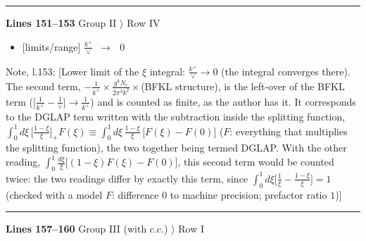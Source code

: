 \documentclass[10pt]{article}
\newenvironment{notebox}{\def\FrameCommand{{\color{notebar}\vrule width 1.5pt}\hspace{6pt}}\MakeFramed{\advance\hsize-\width\FrameRestore}\small}{\endMakeFramed}
\begin{document}
\noindent\rule{\linewidth}{0.3pt}\par\noindent\textbf{Lines 151--153} \quad \textsf{Group II $\rangle$ Row IV} \par
\begin{itemize}[leftmargin=2.2em,itemsep=1pt,topsep=2pt]
\item[\textbf{l.151}] \textsf{\small [limits/range]} $\displaystyle \frac{k^{+}}{\vee}$\ $\longrightarrow$\ $\displaystyle \,0$
\end{itemize}
\begin{notebox}\textsf{\small Note, l.153:} [Lower limit of the $\xi$ integral: $\frac{k^{+}}{\vee}\to0$ (the integral converges there). The second term, $-\frac{1}{k^{+}}\times\frac{g^{4}N_{c}}{2\pi^{3}k^{2}}\times$(BFKL structure), is the left-over of the BFKL term ($\big[\frac{1}{k^{+}}-\frac{1}{\vee}\big]\to\frac{1}{k^{+}}$) and is counted as finite, as the author has it. It corresponds to the DGLAP term written with the subtraction inside the splitting function, $\int_{0}^{1}d\xi\,\big[\frac{1-\xi}{\xi}\big]_{+}F(\xi)\equiv\int_{0}^{1}d\xi\,\frac{1-\xi}{\xi}\,\big[F(\xi)-F(0)\big]$ ($F$: everything that multiplies the splitting function), the two together being termed DGLAP. With the other reading, $\int_{0}^{1}\frac{d\xi}{\xi}\big[(1-\xi)F(\xi)-F(0)\big]$, this second term would be counted twice: the two readings differ by exactly this term, since $\int_{0}^{1}d\xi\big[\frac{1}{\xi}-\frac{1-\xi}{\xi}\big]=1$ (checked with a model $F$: difference $0$ to machine precision; prefactor ratio $1$)]\end{notebox}
\noindent\rule{\linewidth}{0.3pt}\par\noindent\textbf{Lines 157--160} \quad \textsf{Group III (with c.c.) $\rangle$ Row I} \par
\end{document}

